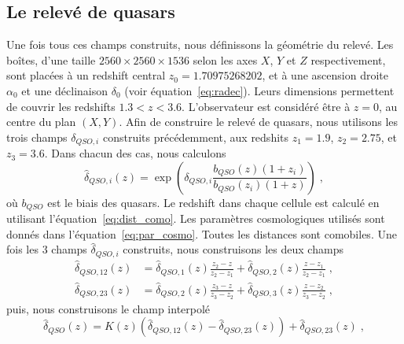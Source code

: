 \documentclass[11pt, twoside, a4paper, openright]{report}
\begin{document}
\subsection{Le relevé de quasars}
Une fois tous ces champs construits, nous définissons la géométrie du relevé. Les boîtes, d'une taille $\num{2560}\times\num{2560}\times\num{1536}$ selon les axes $X$, $Y$ et $Z$ respectivement, sont placées à un redshift central $z_0 = 1.70975268202$, et à une ascension droite $\alpha_0$ et une déclinaison $\delta_0$ (voir équation~\ref{eq:radec}). Leurs dimensions permettent de couvrir les redshifts $1.3 < z < 3.6$. L'observateur est considéré être à $z=0$, au centre du plan $(X,Y)$.
Afin de construire le relevé de quasars, nous utilisons les trois champs $\delta_{QSO, i}$ construits précédemment, aux redshits $z_1 = \num{1.9}$, $z_2 = \num{2.75}$, et $z_3 = \num{3.6}$. Dans chacun des cas, nous calculons
\begin{equation}
  \hat \delta_{QSO, i}(z) = \exp(\delta_{QSO,i} \frac{b_{QSO}(z) (1+z_i)}{b_{QSO}(z_i)(1+z)}) \; ,
\end{equation}
où $b_{QSO}$ est le biais des quasars. Le redshift dans chaque cellule est calculé en utilisant l'équation~\ref{eq:dist_como}. Les paramètres cosmologiques utilisés sont donnés dans l'équation~\ref{eq:par_cosmo}. Toutes les distances sont comobiles.
Une fois les 3 champs $\hat \delta_{QSO, i}$ construits, nous construisons les deux champs
\begin{align}
  \hat \delta_{QSO, 12}(z) &= \hat \delta_{QSO, 1}(z) \frac{z_2 - z}{z_2 - z_1} + \hat \delta_{QSO, 2}(z) \frac{z - z_1}{z_2 - z_1} \; ,\\
  \hat \delta_{QSO, 23}(z) &= \hat \delta_{QSO, 2}(z) \frac{z_3 - z}{z_3 - z_2} + \hat \delta_{QSO, 3}(z) \frac{z - z_2}{z_3 - z_2} \; ,
\end{align}
puis, nous construisons le champ interpolé
\begin{equation}
  \label{eq:lognormal_interp}
 \hat \delta_{QSO}(z) = K(z) \left(\hat \delta_{QSO, 12}(z) - \hat \delta_{QSO, 23}(z)\right) + \hat \delta_{QSO, 23}(z) \; ,
\end{equation}
\end{document}

